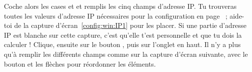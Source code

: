 Coche alors les cases  et  et remplis les cinq champs d'adresse IP. Tu trouveras toutes les valeurs d'adresse IP nécessaires pour la configuration en page~\pageref{tableau:mon_IP} ; aide-toi de la capture d'écran~\ref{config:win:IP1} pour les placer. Si une partie d'adresse IP est blanche sur cette capture, c'est qu'elle t'est personnelle et que tu dois la calculer !
Clique, ensuite sur le bouton , puis sur l'onglet
 en haut.
Il n'y a plus qu'à remplir les différents champs comme sur la
capture d'écran suivante, avec le bouton  et les
flèches pour réordonner les éléments.







